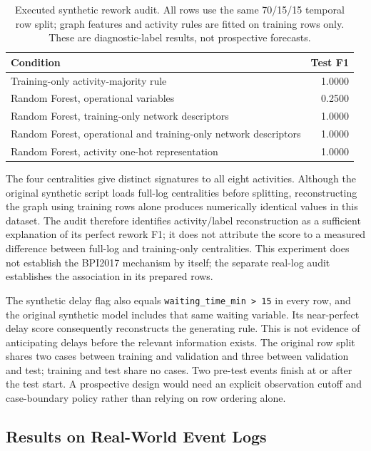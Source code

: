 \documentclass[pdflatex,iicol,Numbered,sn-basic]{sn-jnl}
\begin{document}
\begin{table}[t]
\caption{Executed synthetic rework audit. All rows use the same 70/15/15 temporal row split; graph features and activity rules are fitted on training rows only. These are diagnostic-label results, not prospective forecasts.}
\label{tab:synthetic_audit}
\centering\small
\begin{tabular}{lr}
\toprule
Condition & Test F1\\
\midrule
Training-only activity-majority rule & 1.0000\\
Random Forest, operational variables & 0.2500\\
Random Forest, training-only network descriptors & 1.0000\\
Random Forest, operational and training-only network descriptors & 1.0000\\
Random Forest, activity one-hot representation & 1.0000\\
\bottomrule
\end{tabular}
\end{table}

The four centralities give distinct signatures to all eight activities. Although the original synthetic script loads full-log centralities before splitting, reconstructing the graph using training rows alone produces numerically identical values in this dataset. The audit therefore identifies activity/label reconstruction as a sufficient explanation of its perfect rework F1; it does not attribute the score to a measured difference between full-log and training-only centralities. This experiment does not establish the BPI2017 mechanism by itself; the separate real-log audit establishes the association in its prepared rows.

The synthetic delay flag also equals \texttt{waiting\_time\_min > 15} in every row, and the original synthetic model includes that same waiting variable. Its near-perfect delay score consequently reconstructs the generating rule. This is not evidence of anticipating delays before the relevant information exists. The original row split shares two cases between training and validation and three between validation and test; training and test share no cases. Two pre-test events finish at or after the test start. A prospective design would need an explicit observation cutoff and case-boundary policy rather than relying on row ordering alone.

\subsection{Results on Real-World Event Logs}
\label{subsec:real_results}
\end{document}
